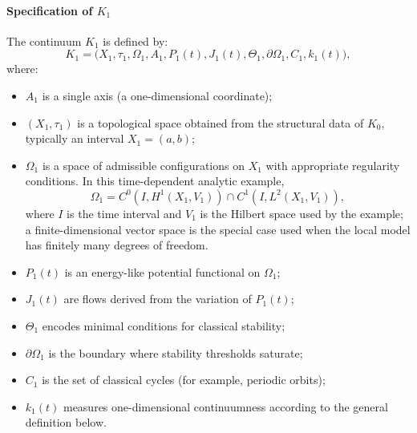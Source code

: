 \paragraph{Specification of \texorpdfstring{\(K_1\)}{K\_1}}
The continuum \(K_1\) is defined by:
\[
    K_1 = \big(X_1,\tau_1,\Omega_1,A_1,P_1(t),J_1(t),\Theta_1,\partial\Omega_1,C_1,k_1(t)\big),
\]
where:
\begin{itemize}
    \item \(A_1\) is a single axis (a one-dimensional coordinate);
    \item \((X_1,\tau_1)\) is a topological space obtained from the structural data of \(K_0\), typically an interval \(X_1 = (a,b)\);
    \item \(\Omega_1\) is a space of admissible configurations on \(X_1\) with appropriate regularity conditions.
          In this time-dependent analytic example,
          \[
              \Omega_1 = C^0(I,H^1(X_1,V_1)) \cap C^1(I,L^2(X_1,V_1)),
          \]
          where \(I\) is the time interval and \(V_1\) is the Hilbert space
          used by the example; a finite-dimensional vector space is the
          special case used when the local model has finitely many degrees of
          freedom.
    \item \(P_1(t)\) is an energy-like potential functional on \(\Omega_1\);
    \item \(J_1(t)\) are flows derived from the variation of \(P_1(t)\);
    \item \(\Theta_1\) encodes minimal conditions for classical stability;
    \item \(\partial\Omega_1\) is the boundary where stability thresholds saturate;
    \item \(C_1\) is the set of classical cycles (for example, periodic orbits);
    \item \(k_1(t)\) measures one-dimensional continuumness according to the general definition below.
\end{itemize}

